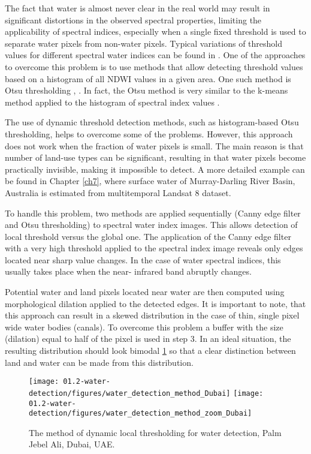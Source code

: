 The fact that water is almost never clear in the real world may result in significant distortions in the observed spectral properties, limiting the applicability of spectral indices, especially when a single fixed threshold is used to separate water pixels from non-water pixels. Typical variations of threshold values for different spectral water indices can be found in \citep{Ji2009}. One of the approaches to overcome this problem is to use methods that allow detecting threshold values based on a histogram of all NDWI values in a given area. One such method is Otsu thresholding \citep{Li2013}, \citep{Yang2014}. In fact, the Otsu method is very similar to the k-means method applied to the histogram of spectral index values \citep{Liu2009}.

The use of dynamic threshold detection methods, such as histogram-based Otsu thresholding, helps to overcome some of the problems. However, this approach does not work when the fraction of water pixels is small. The main reason is that number of land-use types can be significant, resulting in that water pixels become practically invisible, making it impossible to detect. A more detailed example can be found in Chapter \ref{ch7}, where surface water of Murray-Darling River Basin, Australia is estimated from multitemporal Landsat 8 dataset.

To handle this problem, two methods are applied sequentially (Canny edge filter and Otsu thresholding) to spectral water index images. This allows detection of local threshold versus the global one. The application of the Canny edge filter with a very high threshold applied to the spectral index image reveals only edges located near sharp value changes. In the case of water spectral indices, this usually takes place when the near- infrared band abruptly changes.

Potential water and land pixels located near water are then computed using morphological dilation applied to the detected edges. It is important to note, that this approach can result in a skewed distribution in the case of thin, single pixel wide water bodies (canals). To overcome this problem a buffer with the size (dilation) equal to half of the pixel is used in step 3. In an ideal situation, the resulting distribution should look bimodal \ref{fig:water_detection_method} so that a clear distinction between land and water can be made from this distribution.

\begin{figure}
	\centering
	\texttt{[image: 01.2-water-detection/figures/water\_detection\_method\_Dubai]}
	\texttt{[image: 01.2-water-detection/figures/water\_detection\_method\_zoom\_Dubai]}
	\caption{The method of dynamic local thresholding for water detection, Palm Jebel Ali, Dubai, UAE. }
	\label{fig:water_detection_method}
\end{figure}

